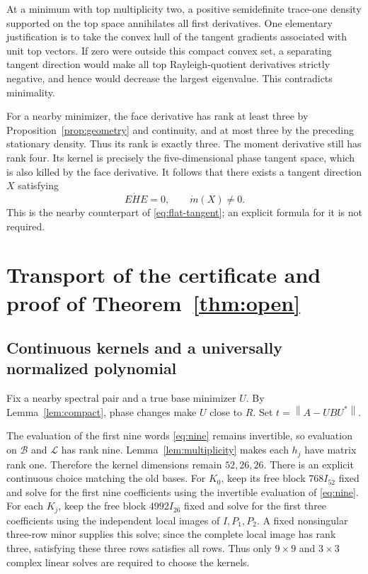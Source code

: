 \documentclass[11pt]{article}
\theoremstyle{remark}\newtheorem{remark}[theorem]{Remark}
\newcommand{\norm}[1]{\left\lVert#1\right\rVert}
\newcommand{\Bwords}{\mathcal B}
\newcommand{\Lwords}{\mathcal L}
\begin{document}
At a minimum with top multiplicity two, a positive semidefinite trace-one density supported on the top space annihilates all first derivatives. One elementary justification is to take the convex hull of the tangent gradients associated with unit top vectors. If zero were outside this compact convex set, a separating tangent direction would make all top Rayleigh-quotient derivatives strictly negative, and hence would decrease the largest eigenvalue. This contradicts minimality.

For a nearby minimizer, the face derivative has rank at least three by Proposition~\ref{prop:geometry} and continuity, and at most three by the preceding stationary density. Thus its rank is exactly three. The moment derivative still has rank four. Its kernel is precisely the five-dimensional phase tangent space, which is also killed by the face derivative. It follows that there exists a tangent direction $X$ satisfying
\begin{equation}\label{eq:near-flat}
 E\dot H E=0,\qquad \dot m(X)\ne0.
\end{equation}
This is the nearby counterpart of \eqref{eq:flat-tangent}; an explicit formula for it is not required.

\section{Transport of the certificate and proof of Theorem~\ref{thm:open}}
\subsection{Continuous kernels and a universally normalized polynomial}
Fix a nearby spectral pair and a true base minimizer $U$. By Lemma~\ref{lem:compact}, phase changes make $U$ close to $R$. Set $t=\norm{A-UBU^*}$.

The evaluation of the first nine words \eqref{eq:nine} remains invertible, so evaluation on $\Bwords$ and $\Lwords$ has rank nine. Lemma~\ref{lem:multiplicity} makes each $h_j$ have matrix rank one. Therefore the kernel dimensions remain $52,26,26$. There is an explicit continuous choice matching the old bases. For $K_0$, keep its free block $768I_{52}$ fixed and solve for the first nine coefficients using the invertible evaluation of \eqref{eq:nine}. For each $K_j$, keep the free block $4992I_{26}$ fixed and solve for the first three coefficients using the independent local images of $I,P_1,P_2$. A fixed nonsingular three-row minor supplies this solve; since the complete local image has rank three, satisfying these three rows satisfies all rows. Thus only $9\times9$ and $3\times3$ complex linear solves are required to choose the kernels.
\end{document}
